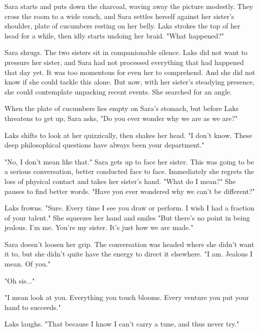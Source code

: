 \documentclass{article}
\begin{document}
Sara starts and puts down the charcoal, waving away the picture modestly. They cross the room to a wide couch, and Sara settles herself against her sister’s shoulder, plate of cucumbers resting on her belly. Laks strokes the top of her head for a while, then idly starts undoing her braid. "What happened?" 

Sara shrugs. The two sisters sit in companionable silence. Laks did not want to pressure her sister, and Sara had not processed everything that had happened that day yet. It was too momentous for even her to comprehend. And she did not know if she could tackle this alone. But now, with her sister's steadying presence, she could contemplate unpacking recent events. She searched for an angle.

When the plate of cucumbers lies empty on Sara's stomach, but before Laks threatens to get up, Sara asks, "Do you ever wonder why we are as we are?"

Laks shifts to look at her quizzically, then shakes her head. "I don't know. These deep philosophical questions have always been your department." 

"No, I don't mean like that." Sara gets up to face her sister. This was going to be a serious conversation, better conducted face to face. Immediately she regrets the loss of physical contact and takes her sister's hand. "What do I mean?" She pauses to find better words. "Have you ever wondered why we can't be different?"

Laks frowns. "Sure. Every time I see you draw or perform. I wish I had a fraction of your talent." She squeezes her hand and smiles "But there's no point in being jealous. I'm me. You're my sister. It’s just how we are made."

Sara doesn't loosen her grip. The conversation was headed where she didn't want it to, but she didn't quite have the energy to direct it elsewhere. "I am. Jealous I mean. Of you." 

"Oh sis..."

"I mean look at you. Everything you touch blooms. Every venture you put your hand to succeeds." 

Laks laughs. "That because I know I can't carry a tune, and thus never try."
\end{document}
